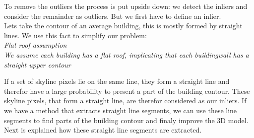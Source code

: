 \documentclass[10pt]{article}
\begin{document}
%


	To remove the outliers the process is put upside down: we detect the
	inliers and consider the remainder as outliers. But we first have to define an inlier.\\
	Lets take the contour of an average building, this is mostly formed by
	straight lines. We use this fact to simplify our problem:\\
	\emph{Flat roof assumption}\\
	\emph{We assume each building has a flat roof, implicating that each buildingwall
	has a straight upper contour}

	If a set of skyline pixels lie on the same line, they form a straight line
	and therefor have a large probability to present a part of the building contour.
	These skyline pixels, that form a straight line, are therefor considered as our
	inliers. 
	If we have a method that extracts straight line segments, we can use these
	line segments to find parts of the building contour and finaly improve the 3D
	model. Next is explained how these straight line segments are extracted.
\end{document}
